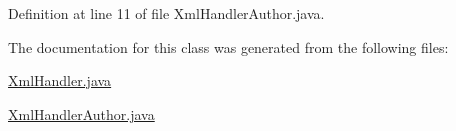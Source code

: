Definition at line 11 of file Xml\-Handler\-Author.\-java.



The documentation for this class was generated from the following files\-:\begin{DoxyCompactItemize}
\item 
\hyperlink{XmlHandler_8java}{Xml\-Handler.\-java}\item 
\hyperlink{XmlHandlerAuthor_8java}{Xml\-Handler\-Author.\-java}\end{DoxyCompactItemize}
